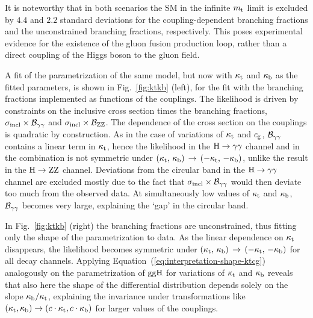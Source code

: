 It is noteworthy that in both scenarios the SM in the infinite $m_{\mathrm{t}}$ limit is excluded by $4.4$ and $2.2$ standard deviations for the coupling-dependent branching fractions and the unconstrained branching fractions, respectively.
% 
This poses experimental evidence for the existence of the gluon fusion production loop, rather than a direct coupling of the Higgs boson to the gluon field.




A fit of the parametrization of the same model, but now with $\kappa_{\mathrm{t}}$ and $\kappa_{\mathrm{b}}$ as the fitted parameters, is shown in Fig.~\ref{fig:ktkb} (left), for the fit with the branching fractions implemented as functions of the couplings.
% 
The likelihood is driven by constraints on the inclusive cross section times the branching fractions, $\sigma_\text{incl} \times \mathcal{B}_{\mathrm{\gamma}\mathrm{\gamma}}$ and $\sigma_\text{incl} \times \mathcal{B}_{\mathrm{Z}\mathrm{Z}}$.
% 
The dependence of the cross section on the couplings is quadratic by construction.
% 
As in the case of variations of $\kappa_{\mathrm{t}}$ and $c_\mathrm{g}$, $\mathcal{B}_{\mathrm{\gamma}\mathrm{\gamma}}$ contains a linear term in $\kappa_{\mathrm{t}}$, hence the likelihood in the $\mathrm{H}\to\mathrm{\gamma}\mathrm{\gamma}$ channel and in the combination is not symmetric under $(\kappa_{\mathrm{t}},\,\kappa_{\mathrm{b}}) \, \to \, (-\kappa_{\mathrm{t}},\,-\kappa_{\mathrm{b}})$, unlike the result in the $\mathrm{H}\to\mathrm{Z}\mathrm{Z}$ channel.
% 
Deviations from the circular band in the $\mathrm{H}\to\mathrm{\gamma}\mathrm{\gamma}$ channel are excluded mostly due to the fact that $\sigma_\text{incl} \times \mathcal{B}_{\mathrm{\gamma}\mathrm{\gamma}}$ would then deviate too much from the observed data.
% 
At simultaneously low values of $\kappa_{\mathrm{t}}$ and $\kappa_{\mathrm{b}}$, $\mathcal{B}_{\mathrm{\gamma}\mathrm{\gamma}}$ becomes very large, explaining the `gap' in the circular band.


In Fig.~\ref{fig:ktkb} (right) the branching fractions are unconstrained, thus fitting only the shape of the parametrization to data.
% 
As the linear dependence on $\kappa_{\mathrm{t}}$ disappears, the likelihood becomes symmetric under $(\kappa_{\mathrm{t}},\,\kappa_{\mathrm{b}}) \, \to \, (-\kappa_{\mathrm{t}},\,-\kappa_{\mathrm{b}})$ for all decay channels.
% 
Applying Equation~(\ref{eq:interpretation-shape-ktcg}) analogously on the parametrization of $\mathrm{g}\mathrm{g}\mathrm{H}$ for variations of $\kappa_{\mathrm{t}}$ and $\kappa_{\mathrm{b}}$ reveals that also here the shape of the differential distribution depends solely on the slope $\kappa_{\mathrm{b}}/\kappa_{\mathrm{t}}$, explaining the invariance under transformations like $(\kappa_{\mathrm{t}}, \kappa_{\mathrm{b}}) \to (c \cdot \kappa_{\mathrm{t}}, c \cdot \kappa_{\mathrm{b}})$ for larger values of the couplings.



